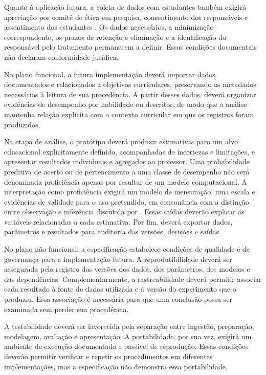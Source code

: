 Quanto à aplicação futura, a coleta de dados com estudantes também exigirá apreciação por comitê de ética em pesquisa, consentimento dos responsáveis e assentimento dos estudantes \cite{CNS5102016}. Os dados necessários, a minimização correspondente, os prazos de retenção e eliminação e a identificação do responsável pelo tratamento permanecem a definir. Essas condições documentais não declaram conformidade jurídica.

No plano funcional, a futura implementação deverá importar dados documentados e relacionados a objetivos curriculares, preservando os metadados necessários à leitura de sua procedência. A partir desses dados, deverá organizar evidências de desempenho por habilidade ou descritor, de modo que a análise mantenha relação explícita com o contexto curricular em que os registros foram produzidos.

Na etapa de análise, o protótipo deverá produzir estimativas para um alvo educacional explicitamente definido, acompanhadas de incertezas e limitações, e apresentar resultados individuais e agregados ao professor. Uma probabilidade preditiva de acerto ou de pertencimento a uma classe de desempenho não será denominada proficiência apenas por resultar de um modelo computacional. A interpretação como proficiência exigirá um modelo de mensuração, uma escala e evidências de validade para o uso pretendido, em consonância com a distinção entre observação e inferência discutida por . Essas saídas deverão explicar as variáveis relacionadas a cada estimativa. Por fim, deverá exportar dados, parâmetros e resultados para auditoria das versões, decisões e saídas.

No plano não funcional, a especificação estabelece condições de qualidade e de governança para a implementação futura. A reprodutibilidade deverá ser assegurada pelo registro das versões dos dados, dos parâmetros, dos modelos e das dependências. Complementarmente, a rastreabilidade deverá permitir associar cada resultado à fonte de dados utilizada e à versão do experimento que o produziu. Essa associação é necessária para que uma conclusão possa ser examinada sem perder sua procedência.

A testabilidade deverá ser favorecida pela separação entre ingestão, preparação, modelagem, avaliação e apresentação. A portabilidade, por sua vez, exigirá um ambiente de execução documentado e passível de reprodução. Essas condições deverão permitir verificar e repetir os procedimentos em diferentes implementações, mas a especificação não demonstra essa portabilidade.

